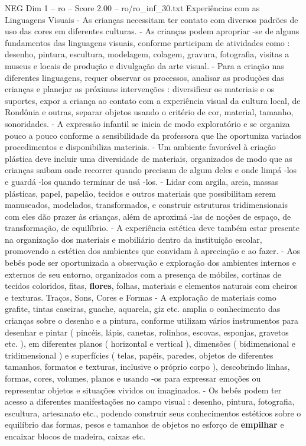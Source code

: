 \begin{textsample}{NEG Dim 1 – ro – Score 2.00 – ro/ro\_inf\_30.txt}  \label{ex:f1_neg_160}
Experiências com as Linguagens Visuais - As crianças necessitam ter contato com diversos padrões de uso das cores em diferentes culturas. - As crianças podem apropriar -se de alguns fundamentos das linguagens visuais, conforme participam de atividades como : desenho, pintura, escultura, modelagem, colagem, gravura, fotografia, visitas a museus e locais de produção e divulgação da arte visual. - Para a criação nas diferentes linguagens, requer observar os processos, analisar as produções das crianças e planejar as próximas intervenções : diversificar os materiais e os suportes, expor a criança ao contato com a experiência visual da cultura local, de Rondônia e outras, separar objetos usando o critério de cor, material, tamanho, sonoridades. - A expressão infantil se inicia de modo exploratório e se organiza pouco a pouco conforme a sensibilidade da professora que lhe oportuniza variados procedimentos e disponibiliza materiais. - Um ambiente favorável à criação plástica deve incluir uma diversidade de materiais, organizados de modo que as crianças saibam onde recorrer quando precisam de algum deles e onde limpá -los e guardá -los quando terminar de usá -los. - Lidar com argila, areia, massas plásticas, papel, papelão, tecidos e outros materiais que possibilitam serem manuseados, modelados, transformados, e construir estruturas tridimensionais com eles dão prazer às crianças, além de aproximá -las de noções de espaço, de transformação, de equilíbrio. - A experiência estética deve também estar presente na organização dos materiais e mobiliário dentro da instituição escolar, promovendo a estética dos ambientes que convidam à apreciação e ao fazer. - Aos bebês pode ser oportunizada a observação e exploração dos ambientes internos e externos de seu entorno, organizados com a presença de móbiles, cortinas de tecidos coloridos, fitas, \textbf{flores}, folhas, materiais e elementos naturais com cheiros e texturas.
Traços, Sons, Cores e Formas - A exploração de materiais como grafite, tintas caseiras, guache, aquarela, giz etc. amplia o conhecimento das crianças sobre o desenho e a pintura, conforme utilizam vários instrumentos para desenhar e pintar ( pincéis, lápis, canetas, rolinhos, escovas, esponjas, gravetos etc. ), em diferentes planos ( horizontal e vertical ), dimensões ( bidimensional e tridimensional ) e superfícies ( telas, papéis, paredes, objetos de diferentes tamanhos, formatos e texturas, inclusive o próprio corpo ), descobrindo linhas, formas, cores, volumes, planos e usando -os para expressar emoções ou representar objetos e situações vividos ou imaginados. - Os bebês podem ter acesso a diferentes manifestações no campo visual : desenho, pintura, fotografia, escultura, artesanato etc., podendo construir seus conhecimentos estéticos sobre o equilíbrio das formas, pesos e tamanhos de objetos no esforço de \textbf{empilhar} e encaixar blocos de madeira, caixas etc.

\end{textsample}
